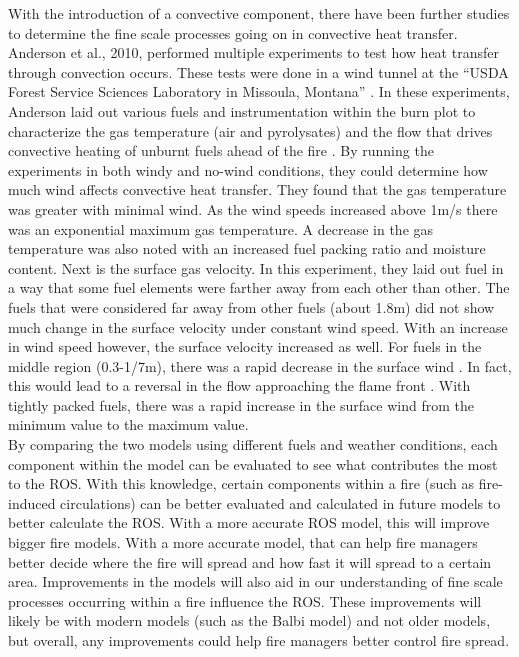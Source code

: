 \documentclass{article}
\begin{document}
\indent With the introduction of a convective component, there have been further studies to determine the fine scale processes going on in convective heat transfer. Anderson et al., 2010, performed multiple experiments to test how heat transfer through convection occurs. These tests were done in a wind tunnel at the “USDA Forest Service Sciences Laboratory in Missoula, Montana” \cite{Anderson2010}. In these experiments, Anderson laid out various fuels and instrumentation within the burn plot to characterize the gas temperature (air and pyrolysates) and the flow that drives convective heating of unburnt fuels ahead of the fire \cite{Anderson2010}. By running the experiments in both windy and no-wind conditions, they could determine how much wind affects convective heat transfer. They found that the gas temperature was greater with minimal wind. As the wind speeds increased above 1m/s there was an exponential maximum gas temperature. A decrease in the gas temperature was also noted with an increased fuel packing ratio and moisture content. Next is the surface gas velocity. In this experiment, they laid out fuel in a way that some fuel elements were farther away from each other than other. The fuels that were considered far away from other fuels (about 1.8m) did not show much change in the surface velocity under constant wind speed. With an increase in wind speed however, the surface velocity increased as well. For fuels in the middle region (0.3-1/7m), there was a rapid decrease in the surface wind \cite{Anderson2010}. In fact, this would lead to a reversal in the flow approaching the flame front \cite{Anderson2010}. With tightly packed fuels, there was a rapid increase in the surface wind from the minimum value to the maximum value. \\
\indent By comparing the two models using different fuels and weather conditions, each component within the model can be evaluated to see what contributes the most to the ROS. With this knowledge, certain components within a fire (such as fire-induced circulations) can be better evaluated and calculated in future models to better calculate the ROS. With a more accurate ROS model, this will improve bigger fire models. With a more accurate model, that can help fire managers better decide where the fire will spread and how fast it will spread to a certain area. Improvements in the models will also aid in our understanding of fine scale processes occurring within a fire influence the ROS. These improvements will likely be with modern models (such as the Balbi model) and not older models, but overall, any improvements could help fire managers better control fire spread. \\
\end{document}
